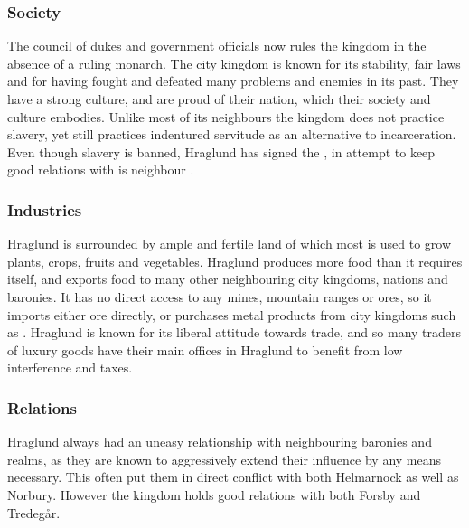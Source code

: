 \subsubsection{Society}

The council of dukes and government officials now rules the kingdom in the
absence of a ruling monarch. The city kingdom is known for its stability,
fair laws and for having fought and defeated many problems and enemies in
its past. They have a strong culture, and are proud of their nation, which
their society and culture embodies. Unlike most of its neighbours the kingdom
does not practice slavery, yet still practices indentured servitude as an
alternative to incarceration. Even though slavery is banned, Hraglund has
signed the , in attempt to keep good relations
with is neighbour .

\subsubsection{Industries}

Hraglund is surrounded by ample and fertile land of which most is used to
grow plants, crops, fruits and vegetables. Hraglund produces more food than
it requires itself, and exports food to many other neighbouring city kingdoms,
nations and baronies. It has no direct access to any mines, mountain ranges or
ores, so it imports either ore directly, or purchases metal products from
city kingdoms such as . Hraglund is known for its liberal
attitude towards trade, and so many traders of luxury goods have their main
offices in Hraglund to benefit from low interference and taxes.

\subsubsection{Relations}

Hraglund always had an uneasy relationship with neighbouring baronies
and realms, as they are known to aggressively extend their influence by any
means necessary. This often put them in direct conflict with both
Helmarnock as well as Norbury. However the kingdom holds good
relations with both Forsby and Tredegår.
